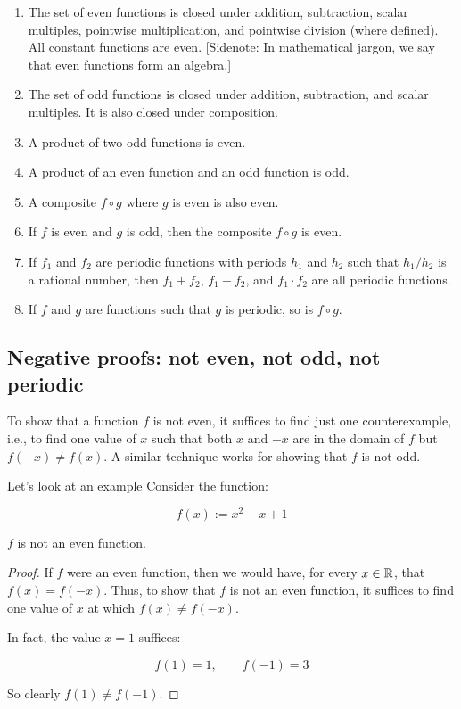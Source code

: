 \documentclass{amsart}
\begin{document}
\begin{enumerate}
\item The set of even functions is closed under addition, subtraction,
  scalar multiples, pointwise multiplication, and pointwise division
  (where defined). All constant functions are even. [Sidenote: In
  mathematical jargon, we say that even functions form an algebra.]
\item The set of odd functions is closed under addition, subtraction,
  and scalar multiples. It is also closed under composition.
\item A product of two odd functions is even.
\item A product of an even function and an odd function is odd.
\item A composite $f \circ g$ where $g$ is even is also even.
\item If $f$ is even and $g$ is odd, then the composite $f \circ g$ is
  even.
\item If $f_1$ and $f_2$ are periodic functions with periods $h_1$ and
  $h_2$ such that $h_1/h_2$ is a rational number, then $f_1 + f_2$,
  $f_1 - f_2$, and $f_1 \cdot f_2$ are all periodic functions.
\item If $f$ and $g$ are functions such that $g$ is periodic, so is $f
  \circ g$.
\end{enumerate}
\subsection{Negative proofs: not even, not odd, not periodic}

To show that a function $f$ is not even, it suffices to find just one
counterexample, i.e., to find one value of $x$ such that both $x$ and
$-x$ are in the domain of $f$ but $f(-x) \ne f(x)$. A similar technique works for showing that $f$ is not odd.

Let's look at an example Consider the function:

\begin{equation*}
  f(x) := x^2 - x + 1
\end{equation*}

\begin{claimer}
  $f$ is not an even function.
\end{claimer}

\begin{proof}
  If $f$ were an even function, then we would have, for every $x \in
  \mathbb{R}$, that $f(x) = f(-x)$. Thus, to show that $f$ is not an even
  function, it suffices to find one value of $x$ at which $f(x) \ne
  f(-x)$.

  In fact, the value $x = 1$ suffices:

  $$f(1) = 1, \qquad f(-1) = 3$$

  So clearly $f(1) \ne f(-1)$.
\end{proof}
\end{document}
